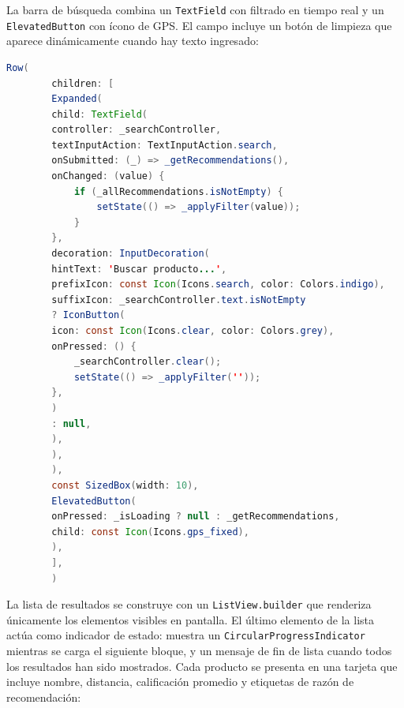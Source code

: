 \documentclass[11pt, letterpaper]{article}
\begin{document}
	La barra de búsqueda combina un \texttt{TextField} con filtrado en tiempo
	real y un \texttt{ElevatedButton} con ícono de GPS. El campo incluye un
	botón de limpieza que aparece dinámicamente cuando hay texto ingresado:
	
	\begin{lstlisting}[language=Java, caption=Barra de búsqueda y botón GPS]
		Row(
		children: [
		Expanded(
		child: TextField(
		controller: _searchController,
		textInputAction: TextInputAction.search,
		onSubmitted: (_) => _getRecommendations(),
		onChanged: (value) {
			if (_allRecommendations.isNotEmpty) {
				setState(() => _applyFilter(value));
			}
		},
		decoration: InputDecoration(
		hintText: 'Buscar producto...',
		prefixIcon: const Icon(Icons.search, color: Colors.indigo),
		suffixIcon: _searchController.text.isNotEmpty
		? IconButton(
		icon: const Icon(Icons.clear, color: Colors.grey),
		onPressed: () {
			_searchController.clear();
			setState(() => _applyFilter(''));
		},
		)
		: null,
		),
		),
		),
		const SizedBox(width: 10),
		ElevatedButton(
		onPressed: _isLoading ? null : _getRecommendations,
		child: const Icon(Icons.gps_fixed),
		),
		],
		)
	\end{lstlisting}
	
	La lista de resultados se construye con un \texttt{ListView.builder} que
	renderiza únicamente los elementos visibles en pantalla. El último elemento
	de la lista actúa como indicador de estado: muestra un
	\texttt{CircularProgressIndicator} mientras se carga el siguiente bloque,
	y un mensaje de fin de lista cuando todos los resultados han sido mostrados.
	Cada producto se presenta en una tarjeta que incluye nombre, distancia,
	calificación promedio y etiquetas de razón de recomendación:
	
\end{document}
